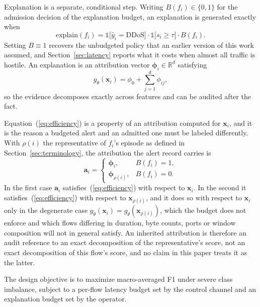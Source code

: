 \documentclass{ieeeaccess}
\begin{document}
Explanation is a separate, conditional step. Writing $B(f_i) \in \{0,1\}$ for the
admission decision of the explanation budget, an explanation is generated exactly
when
\begin{equation}
\mathrm{explain}(f_i) = \mathbb{1}\bigl[\hat{y}_i = \mathrm{DDoS}\bigr] \cdot
                        \mathbb{1}\bigl[s_i \geq \tau\bigr] \cdot B(f_i).
\label{eq:trigger}
\end{equation}
Setting $B \equiv 1$ recovers the unbudgeted policy that an earlier version of
this work assumed, and Section~\ref{sec:latency} reports what it costs when
almost all traffic is hostile. An explanation is an attribution vector
$\boldsymbol{\phi}_i \in \mathbb{R}^{d}$ satisfying
\begin{equation}
g_{\theta}(\mathbf{x}_i) = \phi_0 + \sum_{j=1}^{d} \phi_{ij},
\label{eq:efficiency}
\end{equation}
so the evidence decomposes exactly across features and can be audited after the
fact.

Equation~(\ref{eq:efficiency}) is a property of an attribution computed for
$\mathbf{x}_i$, and it is the reason a budgeted alert and an admitted one must be
labeled differently. With $\rho(i)$ the representative of $f_i$'s episode as
defined in Section~\ref{sec:terminology}, the attribution the alert record
carries is
\begin{equation}
\mathbf{a}_i =
\begin{cases}
\boldsymbol{\phi}_i, & B(f_i) = 1,\\[2pt]
\boldsymbol{\phi}_{\rho(i)}, & B(f_i) = 0 .
\end{cases}
\label{eq:deliver}
\end{equation}
In the first case $\mathbf{a}_i$ satisfies~(\ref{eq:efficiency}) with respect to
$\mathbf{x}_i$. In the second it satisfies~(\ref{eq:efficiency}) with respect to
$\mathbf{x}_{\rho(i)}$, and it does so with respect to $\mathbf{x}_i$ only in the
degenerate case $g_{\theta}(\mathbf{x}_i) = g_{\theta}(\mathbf{x}_{\rho(i)})$,
which the budget does not enforce and which flows differing in duration, byte
counts, ports or window composition will not in general satisfy. An inherited
attribution is therefore an audit reference to an exact decomposition of the
representative's score, not an exact decomposition of this flow's score, and no
claim in this paper treats it as the latter.

The design objective is to maximize macro-averaged F1 under severe class
imbalance, subject to a per-flow latency budget set by the control channel and an
explanation budget set by the operator.
\end{document}
